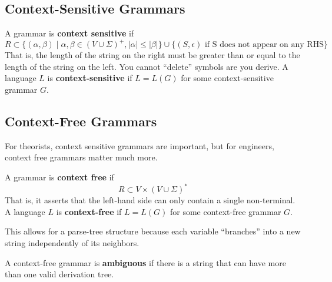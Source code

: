 \subsection{Context-Sensitive Grammars}

  \begin{definition}
    A grammar is \textbf{context sensitive} if 
    \begin{equation}
      R \subset \{(\alpha, \beta) \mid \alpha, \beta \in (V \cup \Sigma)^+, |\alpha| \leq |\beta|\} \cup \{(S, \epsilon) \text{ if S does not appear on any RHS} \}
    \end{equation}
    That is, the length of the string on the right must be greater than or equal to the length of the string on the left. You cannot ``delete'' symbols are you derive. A language $L$ is \textbf{context-sensitive} if $L = L(G)$ for some context-sensitive grammar $G$. 
  \end{definition}

\subsection{Context-Free Grammars}

  For theorists, context sensitive grammars are important, but for engineers, context free grammars matter much more.  

  \begin{definition}
    A grammar is \textbf{context free} if 
    \begin{equation}
      R \subset V \times (V \cup \Sigma)^\ast
    \end{equation}
    That is, it asserts that the left-hand side can only contain a single non-terminal. A language $L$ is \textbf{context-free} if $L = L(G)$ for some context-free grammar $G$. 
  \end{definition}

  This allows for a parse-tree structure because each variable ``branches'' into a new string independently of its neighbors. 

  \begin{definition}[Ambiguous]
    A context-free grammar is \textbf{ambiguous} if there is a string that can have more than one valid derivation tree. 
  \end{definition}

